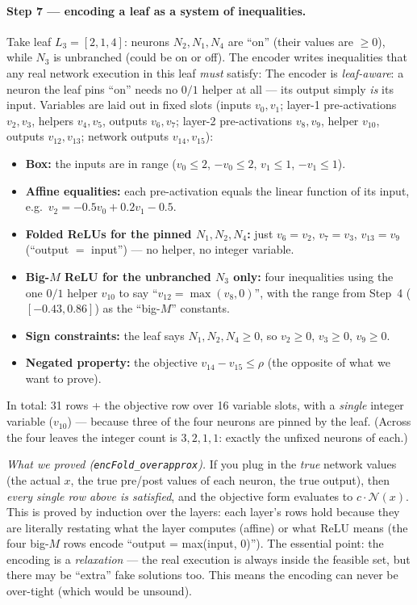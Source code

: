 \documentclass[runningheads]{llncs}
\newcommand{\net}{\mathcal{N}}
\newcommand{\leaf}{L}
\newcommand{\code}[1]{\texttt{#1}}
\begin{document}
\paragraph{Step 7 --- encoding a leaf as a system of inequalities.}
Take leaf $\leaf_3=[2,1,4]$: neurons $N_2,N_1,N_4$ are ``on'' (their values are
$\ge0$), while $N_3$ is unbranched (could be on or off). The encoder writes
inequalities that any real network execution in this leaf \emph{must} satisfy:
The encoder is \emph{leaf-aware}: a neuron the leaf pins ``on'' needs no $0/1$ helper
at all --- its output simply \emph{is} its input. Variables are laid out in fixed
slots (inputs $v_0,v_1$; layer-1 pre-activations $v_2,v_3$, helpers $v_4,v_5$, outputs
$v_6,v_7$; layer-2 pre-activations $v_8,v_9$, helper $v_{10}$, outputs $v_{12},v_{13}$;
network outputs $v_{14},v_{15}$):
\begin{itemize}
\item \textbf{Box:} the inputs are in range ($v_0\le2$, $-v_0\le2$, $v_1\le1$, $-v_1\le1$).
\item \textbf{Affine equalities:} each pre-activation equals the linear function of its
      input, e.g.\ $v_2=-0.5v_0+0.2v_1-0.5$.
\item \textbf{Folded ReLUs for the pinned $N_1,N_2,N_4$:} just $v_6=v_2$, $v_7=v_3$,
      $v_{13}=v_9$ (``output $=$ input'') --- no helper, no integer variable.
\item \textbf{Big-$M$ ReLU for the unbranched $N_3$ only:} four inequalities using the
      one $0/1$ helper $v_{10}$ to say ``$v_{12}=\max(v_8,0)$'', with the range from
      Step~4 ($[-0.43,0.86]$) as the ``big-$M$'' constants.
\item \textbf{Sign constraints:} the leaf says $N_1,N_2,N_4\ge0$, so $v_2\ge0$,
      $v_3\ge0$, $v_9\ge0$.
\item \textbf{Negated property:} the objective $v_{14}-v_{15}\le\rho$ (the opposite of
      what we want to prove).
\end{itemize}
In total: 31 rows + the objective row over 16 variable slots, with a \emph{single}
integer variable ($v_{10}$) --- because three of the four neurons are pinned by the
leaf. (Across the four leaves the integer count is $3,2,1,1$: exactly the unfixed
neurons of each.)

\emph{What we proved (\code{encFold\_overapprox}).} If you plug in the
\emph{true} network values (the actual $x$, the true pre/post values of each neuron,
the true output), then \emph{every single row above is satisfied}, and the objective
form evaluates to $c\cdot\net(x)$. This is proved by induction over the layers: each
layer's rows hold because they are literally restating what the layer computes (affine)
or what ReLU means (the four big-$M$ rows encode ``output = max(input, 0)''). The
essential point: the encoding is a \emph{relaxation} --- the real execution is always
inside the feasible set, but there may be ``extra'' fake solutions too. This means the
encoding can never be over-tight (which would be unsound).
\end{document}
